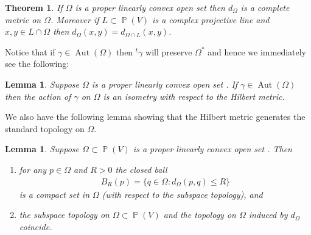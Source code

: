 \documentclass[12pt]{amsart}
\theoremstyle{plain}
\newtheorem{theorem}[proposition]{Theorem}
\newtheorem{lemma}[proposition]{Lemma}
\theoremstyle{definition}
\theoremstyle{remark}
\begin{document}
\begin{theorem}\cite[Lemma 2.1, Lemma 2.2]{D2009}\label{thm:dubois}
If $\Omega$ is a proper linearly convex open set  then $d_{\Omega}$ is a complete metric on $\Omega$. Moreover if $L \subset \operatorname{\mathbb{P}}(V)$ is a complex projective line and $x,y \in L \cap \Omega$ then $d_{\Omega}(x,y) = d_{\Omega \cap L}(x,y)$.
\end{theorem}

Notice that if $\gamma \in \operatorname{Aut}(\Omega)$ then $^t\gamma$ will preserve $\Omega^*$ and hence we immediately see the following:

\begin{lemma}
Suppose $\Omega$ is a proper linearly convex open set . If $\gamma \in \operatorname{Aut}(\Omega)$ then the action of $\gamma$ on $\Omega$ is an isometry with respect to the Hilbert metric.
\end{lemma}

We also have the following lemma showing that the Hilbert metric generates the standard topology on $\Omega$.

\begin{lemma}
\label{lem:same_topo}
Suppose $\Omega \subset \operatorname{\mathbb{P}}(V)$ is a proper linearly convex open set . Then 
\begin{enumerate}
\item for any $p \in \Omega$ and $R >0$ the closed ball 
\begin{align*}
B_R(p) = \{ q \in \Omega : d_{\Omega}(p,q) \leq R\}
\end{align*}
is a compact set in $\Omega$ (with respect to the subspace topology), and
\item the subspace topology on $\Omega \subset \operatorname{\mathbb{P}}(V)$ and the topology on $\Omega$ induced by $d_{\Omega}$ coincide.
\end{enumerate}
\end{lemma}
\end{document}
